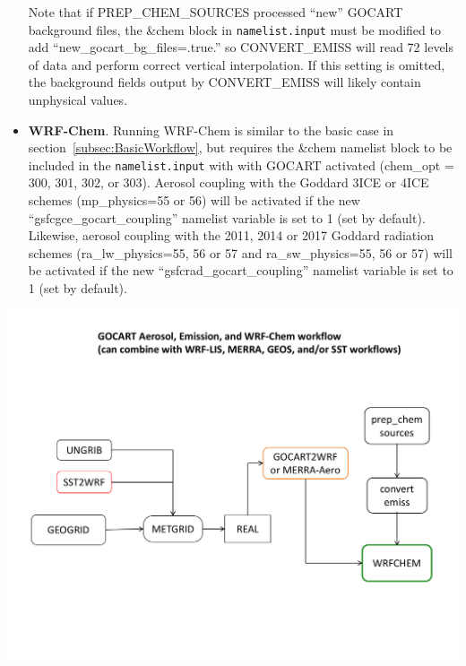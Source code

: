 \begin{itemize}

Note that if PREP\_CHEM\_SOURCES processed ``new'' GOCART background files,
the \&chem block in \texttt{namelist.input} must be modified to add
``new\_gocart\_bg\_files=.true.'' so CONVERT\_EMISS will read 72 levels
of data and perform correct vertical interpolation.  If this setting is 
omitted, the background fields output by CONVERT\_EMISS will likely contain 
unphysical values.

\item \textbf{WRF-Chem}. Running WRF-Chem is similar to the basic case in 
section~\ref{subsec:BasicWorkflow}, but requires the \&chem namelist block
to be included in the \texttt{namelist.input} with with GOCART activated
(chem\_opt = 300, 301, 302, or 303). Aerosol coupling with the Goddard
3ICE or 4ICE schemes (mp\_physics=55 or 56) will be activated if the new
``gsfcgce\_gocart\_coupling'' namelist variable is set to 1 (set by 
default). Likewise, aerosol coupling with the 2011, 2014 or 2017 Goddard radiation 
schemes (ra\_lw\_physics=55, 56 or 57 and ra\_sw\_physics=55, 56 or 57) will 
be activated if the new ``gsfcrad\_gocart\_coupling'' namelist variable is set
to 1 (set by default).
\end{itemize}

\centerline{\includegraphics[width=5.5in]{GOCART_emiss_workflow}}

